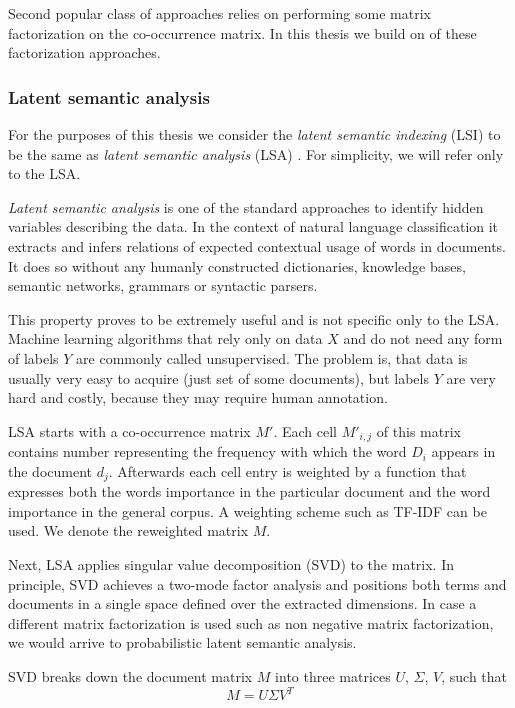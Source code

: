     Second popular class of approaches relies on performing some matrix factorization on the co-occurrence matrix.
    In this thesis we build on of these factorization approaches.
    
    \subsubsection{Latent semantic analysis} \label{sec:lsa}
    
    For the purposes of this thesis we consider the \emph{latent semantic indexing} (LSI) to be the same as \emph{latent semantic analysis} (LSA) \cite{deerwester1990indexing}.
    For simplicity, we will refer only to the LSA.
    
    \emph{Latent semantic analysis} is one of the standard approaches to identify hidden variables describing the data.
    In the context of natural language classification it extracts and infers relations of expected contextual usage of words in documents.
    It does so without any humanly constructed dictionaries, knowledge bases, semantic networks, grammars or syntactic parsers.
    
    This property proves to be extremely useful and is not specific only to the LSA.
    Machine learning algorithms that rely only on data $X$ and do not need any form of labels $Y$ are commonly called unsupervised.
    The problem is, that data is usually very easy to acquire (just set of some documents), but labels $Y$ are very hard and costly, because they may require human annotation.
    
    LSA starts with a co-occurrence matrix $M'$. 
    Each cell $M'_{i,j}$ of this matrix contains number representing the frequency with which  the  word $D_i$ appears in the document $d_j$.
    Afterwards each cell entry is weighted by a function that expresses both the words importance in the particular document and the word importance in the general corpus.
    A weighting scheme such as TF-IDF can be used.
    We denote the reweighted matrix $M$. 
    
    Next, LSA applies singular value decomposition (SVD) to the matrix.
    In principle, SVD achieves a two-mode factor analysis and positions both terms and documents in a single space defined over the extracted dimensions.
    In case a different matrix factorization is used such as non negative matrix factorization, we would arrive to probabilistic latent semantic analysis.
    
    SVD breaks down the document matrix $M$ into three matrices $U$, $\Sigma$, $V$,\cite{papadimitriou2000latent} %
    \cite{maas2011learning} %
    \cite{wiemer2004latent} %
    \cite{landauer1998introduction} %
    such that $$M=U \Sigma V^T$$ 

